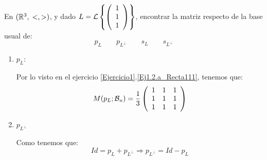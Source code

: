 \begin{ejercicio}
    En $(\mathbb{R}^3,\;<,>)$, y dado $L=\mathcal{L}\left\{\left(\begin{array}{c}
         1 \\ 1 \\ 1
    \end{array}\right)\right\}$, encontrar la matriz respecto de la base usual de:
    \begin{equation*}
        p_L \qquad p_{L^\perp} \qquad s_L \qquad s_{L^\perp}
    \end{equation*}
    \begin{enumerate}
        \item $p_L$:

        Por lo visto en el ejercicio \ref{Ejercicio1}.\ref{Ej1.2.a_Recta111}, tenemos que:
        \begin{equation*}
            M(p_L;\mathcal{B}_u)=\frac{1}{3}\left(\begin{array}{ccc}
                 1 & 1 & 1 \\
                 1 & 1 & 1 \\
                 1 & 1 & 1 \\
            \end{array}\right)
        \end{equation*}

        \item $p_{L^\perp}$

        Como tenemos que:
        \begin{equation*}
            Id = p_L + p_{L^\perp} \Longrightarrow p_{L^\perp} = Id - p_L
        \end{equation*}


\end{enumerate}
\end{ejercicio}
